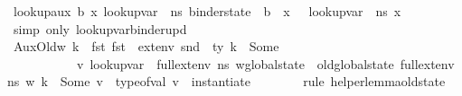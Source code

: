 \begin{isabellebody}
\ lookup{\isacharunderscore}{\kern0pt}aux{\isacharcolon}{\kern0pt}{\isachardoublequoteopen}{\isasymAnd}\ b\ x{\isachardot}{\kern0pt}\ lookup{\isacharunderscore}{\kern0pt}var\ {\isasymLambda}\ {\isacharparenleft}{\kern0pt}n{\isacharunderscore}{\kern0pt}s{\isasymlparr}\ binder{\isacharunderscore}{\kern0pt}state\ {\isacharcolon}{\kern0pt}{\isacharequal}{\kern0pt}\ b\ {\isasymrparr}{\isacharparenright}{\kern0pt}\ x\ \ {\isacharequal}{\kern0pt}\ lookup{\isacharunderscore}{\kern0pt}var\ {\isasymLambda}\ n{\isacharunderscore}{\kern0pt}s\ x{\isachardoublequoteclose}\ \ \isamarkupfalse%
\ {\isacharparenleft}{\kern0pt}simp\ only{\isacharcolon}{\kern0pt}\ lookup{\isacharunderscore}{\kern0pt}var{\isacharunderscore}{\kern0pt}binder{\isacharunderscore}{\kern0pt}upd{\isacharparenright}{\kern0pt}\isanewline
\ \ \ \ \isamarkupfalse%
\ AuxOld{\isacharcolon}{\kern0pt}{\isachardoublequoteopen}{\isasymAnd}w{\isachardot}{\kern0pt}\ {\isasymforall}k\ {\isasymtau}{\isacharprime}{\kern0pt}{\isachardot}{\kern0pt}\ fst\ {\isacharparenleft}{\kern0pt}fst\ {\isasymDelta}{\isacharcomma}{\kern0pt}\ ext{\isacharunderscore}{\kern0pt}env\ {\isacharparenleft}{\kern0pt}snd\ {\isasymDelta}{\isacharparenright}{\kern0pt}\ ty{\isacharparenright}{\kern0pt}\ k\ {\isacharequal}{\kern0pt}\ Some\ {\isasymtau}{\isacharprime}{\kern0pt}\ {\isasymlongrightarrow}\isanewline
\ \ \ \ \ \ \ \ \ \ \ {\isacharparenleft}{\kern0pt}{\isasymexists}v{\isachardot}{\kern0pt}\ lookup{\isacharunderscore}{\kern0pt}var\ {\isasymLambda}\ {\isacharparenleft}{\kern0pt}{\isacharparenleft}{\kern0pt}full{\isacharunderscore}{\kern0pt}ext{\isacharunderscore}{\kern0pt}env\ n{\isacharunderscore}{\kern0pt}s\ w{\isacharparenright}{\kern0pt}{\isasymlparr}global{\isacharunderscore}{\kern0pt}state\ {\isacharcolon}{\kern0pt}{\isacharequal}{\kern0pt}\ old{\isacharunderscore}{\kern0pt}global{\isacharunderscore}{\kern0pt}state\ {\isacharparenleft}{\kern0pt}full{\isacharunderscore}{\kern0pt}ext{\isacharunderscore}{\kern0pt}env\ n{\isacharunderscore}{\kern0pt}s\ w{\isacharparenright}{\kern0pt}{\isasymrparr}{\isacharparenright}{\kern0pt}\ k\ {\isacharequal}{\kern0pt}\ Some\ v\ {\isasymand}\ type{\isacharunderscore}{\kern0pt}of{\isacharunderscore}{\kern0pt}val\ v\ {\isacharequal}{\kern0pt}\ instantiate\ {\isasymOmega}\ {\isasymtau}{\isacharprime}{\kern0pt}{\isacharparenright}{\kern0pt}{\isachardoublequoteclose}\isanewline
\ \ \ \ \isamarkupfalse%
\ {\isacharparenleft}{\kern0pt}rule\ helper{\isacharunderscore}{\kern0pt}lemma{\isacharunderscore}{\kern0pt}old{\isacharunderscore}{\kern0pt}state{\isacharparenright}{\kern0pt}\isanewline

\end{isabellebody}

